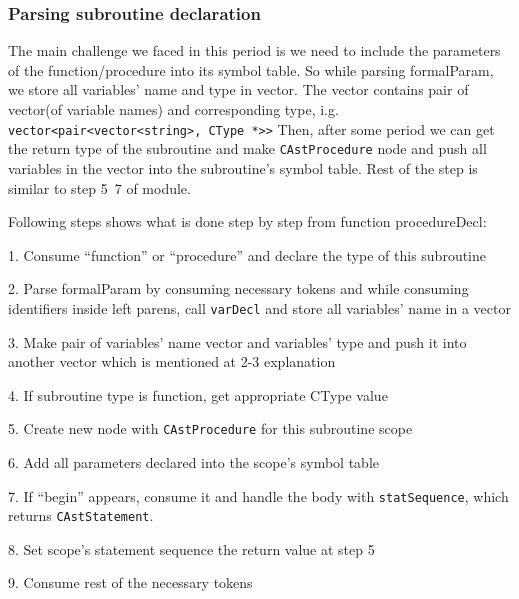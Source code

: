 \documentclass[12pt]{article}
\begin{document}
\subsubsection*{Parsing subroutine declaration}
\label{subsubsection:Parsing subroutine declaration}

The main challenge we faced in this period is we need to include the parameters of the function/procedure into its symbol table.
So while parsing formalParam, we store all variables’ name and type in vector. The vector contains pair of vector(of variable names) and corresponding type, 
i.g. \texttt{vector<pair<vector<string>, CType *>>}
Then, after some period we can get the return type of the subroutine and make \texttt{CAstProcedure} node and push all variables in the vector into the subroutine’s symbol table. 
Rest of the step is similar to step 5~7 of module.

\begin{MyIndentedList}
    \item Following steps shows what is done step by step from function procedureDecl:
    \begin{MyIndentedList}
        \item 1. Consume “function” or “procedure” and declare the type of this subroutine
        \item 2. Parse formalParam by consuming necessary tokens and while consuming identifiers inside left parens, call \texttt{varDecl} and store all variables’ name in a vector
        \item 3. Make pair of variables’ name vector and variables’ type and push it into another vector which is mentioned at 2-3 explanation
        \item 4. If subroutine type is function, get appropriate CType value 
        \item 5. Create new node with \texttt{CAstProcedure} for this subroutine scope
        \item 6. Add all parameters declared into the scope’s symbol table
        \item 7.  If “begin” appears, consume it and handle the body with \texttt{statSequence}, which returns \texttt{CAstStatement}.
        \item 8. Set scope’s statement sequence the return value at step 5
        \item 9. Consume rest of the necessary tokens                
    \end{MyIndentedList}
\end{MyIndentedList}
\end{document}
